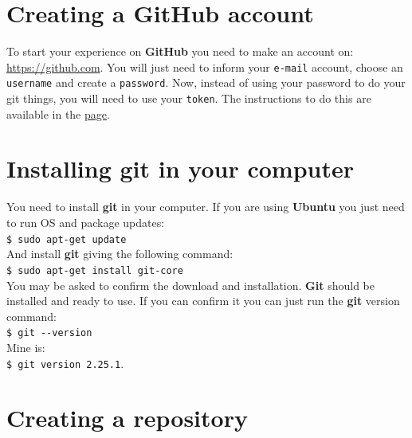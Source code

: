 \documentclass[12pt,a4paper,titlepage,brazil]{article}
\begin{document}

\section{Creating a GitHub account}

To start your experience on {\bf GitHub} you need to make an account on:
\url{https://github.com}. You will just need to inform your \texttt{e-mail} account, choose an \texttt{username} and create a \texttt{password}. Now, instead of using your password to do your git things, you will need to use your \texttt{token}. The instructions to do this are available in the \href{https://docs.github.com/en/github/authenticating-to-github/creating-a-personal-access-token}{page}.


\section{Installing git in your computer}

You need to install {\bf git} in your computer. If you are using {\bf Ubuntu} you just need to run OS and package updates:\\

\texttt{\$ sudo apt-get update}\\

And install {\bf git} giving the following command:\\

\texttt{\$ sudo apt-get install git-core}\\

You may be asked to confirm the download and installation. {\bf Git} should be installed and ready to use. If you can confirm it you can just run the {\bf git} version command:\\

\texttt{\$ git -\hspace{0.01cm}-version}\\

Mine is:\\

\texttt{\$ git version 2.25.1}.


\section{Creating a repository}
\end{document}
